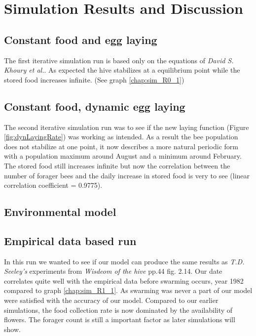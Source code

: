 \section{Simulation Results and Discussion}
\subsection{Constant food and egg laying}
\label{chap:constantFoodConstantLaying}
The first iterative simulation run is based only on the equations of \textit{David S. Khoury et al.}\cite{khoury13}. As expected the hive stabilizes at a equilibrium point while the stored food increases infinite. (See graph \ref{chap:sim_R0_1})
\subsection{Constant food, dynamic egg laying}
\label{chap:constantFoodDynamicLaying}
The second iterative simulation run was to see if the new laying function (Figure \ref{fig:dynLayingRate})  was working as intended. As a result the bee population does not stabilize at one point, it now describes a more natural periodic form with a population maximum around August and a minimum around February. The stored food still increases infinite but now the correlation between the number of forager bees and the daily increase in stored food is very to see (linear correlation coefficient =  0.9775).

\subsection{Environmental model}
	\subsection{Empirical data based run}
	In this run we wanted to see if our model can produce the same results as \textit{T.D. Seeley's} experiments from \textit{Wisdeom of the hive} pp.44 fig. 2.14. Our date correlates quite well with the empirical data before swarming occurs, year 1982 compared to graph \ref{chap:sim_R1_1}. As swarming was never a part of our model were satisfied with the accuracy of our model.	
	Compared to our earlier simulations, the food collection rate is now dominated by the availability of flowers. The forager count is still a important factor as later simulations will show.
